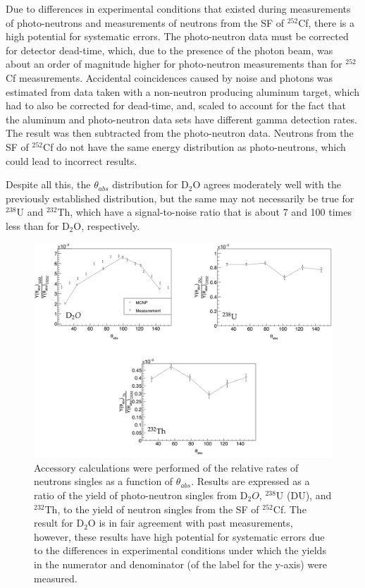  Due to differences in experimental conditions that existed during measurements of photo-neutrons and measurements of neutrons from the SF of $^{252}$Cf, there is a high potential for systematic errors.
The photo-neutron data must be corrected for detector dead-time, which, due to the presence of the photon beam, was about an order of magnitude higher for photo-neutron measurements than for $^{252}$Cf measurements.
Accidental coincidences caused by noise and photons was estimated from data taken with a non-neutron producing aluminum target, which had to also be corrected for dead-time, and, scaled to account for the fact that the aluminum and photo-neutron data sets have different gamma detection rates.
The result was then subtracted from the photo-neutron data.
Neutrons from the SF of $^{252}$Cf do not have the same energy distribution as photo-neutrons, which could lead to incorrect results.

Despite all this, the $\theta_{abs}$ distribution for D$_{2}$O agrees moderately well with the previously established distribution, but the same may not necessarily be true for $^{238}$U and $^{232}$Th, which have a signal-to-noise ratio that is about 7 and 100 times less than for D$_{2}$O, respectively.

\begin{figure}
    \includegraphics[width = 1\textwidth]{Content/Results/Singles.png}
    \caption{Accessory calculations were performed of the relative rates of neutrons singles as a function of $\theta_{abs}$. 
    Results are expressed as a ratio of the yield of photo-neutron singles from D$_{2}O$, $^{238}$U (DU), and $^{232}$Th, to the yield of neutron singles from the SF of $^{252}$Cf.
   The result for D$_{2}$O is in fair agreement with past measurements, however, these results have high potential for systematic errors due to the differences in experimental conditions under which the yields in the numerator and denominator (of the label for the y-axis) were measured.
       }
    \label{fig:Singles}
\end{figure}
\FloatBarrier